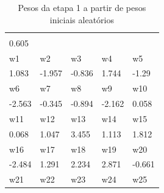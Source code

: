 \documentclass[11pt]{article}
\begin{document}
\begin{table}[h]
  \centering
  \caption{Pesos da etapa 1 a partir de pesos iniciais aleatórios}
  \label{tab:1wr}
  \begin{tabular}[width=8cm]{lllll}
  \cellcolor[HTML]{000000}{\color[HTML]{FFFFFF} w0} &                            &                            &                            &                            \\
  0.605                                             &                            &                            &                            &                            \\
  \rowcolor[HTML]{000000}
  {\color[HTML]{FFFFFF} w1}                         & {\color[HTML]{FFFFFF} w2}  & {\color[HTML]{FFFFFF} w3}  & {\color[HTML]{FFFFFF} w4}  & {\color[HTML]{FFFFFF} w5}  \\
  1.083                                             & -1.957                     & -0.836                     & 1.744                      & -1.29                      \\
  \rowcolor[HTML]{000000}
  {\color[HTML]{FFFFFF} w6}                         & {\color[HTML]{FFFFFF} w7}  & {\color[HTML]{FFFFFF} w8}  & {\color[HTML]{FFFFFF} w9}  & {\color[HTML]{FFFFFF} w10} \\
  -2.563                                            & -0.345                     & -0.894                     & -2.162                     & 0.058                      \\
  \rowcolor[HTML]{000000}
  {\color[HTML]{FFFFFF} w11}                        & {\color[HTML]{FFFFFF} w12} & {\color[HTML]{FFFFFF} w13} & {\color[HTML]{FFFFFF} w14} & {\color[HTML]{FFFFFF} w15} \\
  0.068                                             & 1.047                      & 3.455                      & 1.113                      & 1.812                      \\
  \rowcolor[HTML]{000000}
  {\color[HTML]{FFFFFF} w16}                        & {\color[HTML]{FFFFFF} w17} & {\color[HTML]{FFFFFF} w18} & {\color[HTML]{FFFFFF} w19} & {\color[HTML]{FFFFFF} w20} \\
  -2.484                                            & 1.291                      & 2.234                      & 2.871                      & -0.661                     \\
  \rowcolor[HTML]{000000}
  {\color[HTML]{FFFFFF} w21}                        & {\color[HTML]{FFFFFF} w22} & {\color[HTML]{FFFFFF} w23} & {\color[HTML]{FFFFFF} w24} & {\color[HTML]{FFFFFF} w25} \\

\end{tabular}
\end{table}
\end{document}
